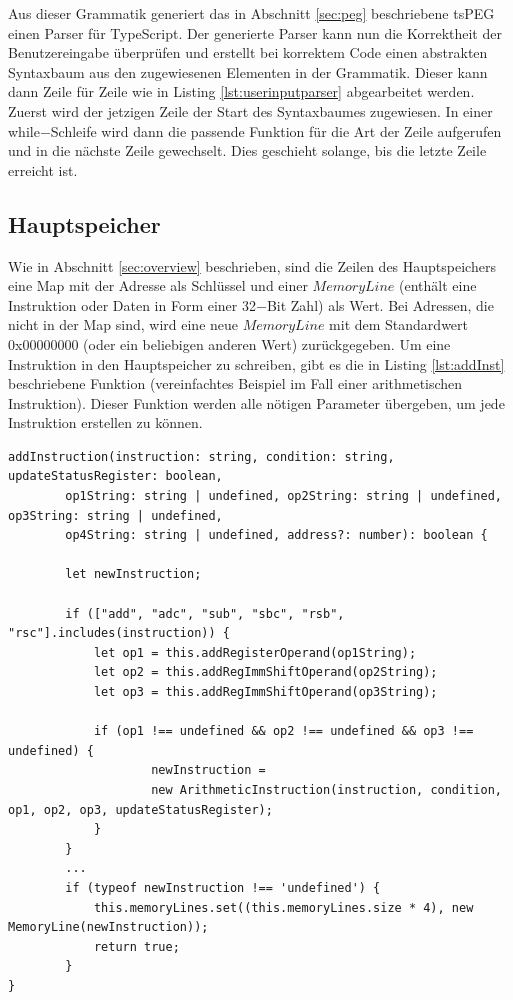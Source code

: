 \documentclass[a4paper, 11pt, onecolumn]{article}
\begin{document}
Aus dieser Grammatik generiert das in Abschnitt \ref{sec:peg} beschriebene tsPEG \cite{tspeg} einen Parser für TypeScript. Der generierte Parser kann nun die Korrektheit der Benutzereingabe überprüfen und erstellt bei korrektem Code einen abstrakten Syntaxbaum aus den zugewiesenen Elementen in der Grammatik. Dieser kann dann Zeile für Zeile wie in Listing \ref{lst:userinputparser} abgearbeitet werden. Zuerst wird der jetzigen Zeile der Start des Syntaxbaumes zugewiesen. In einer while$-$Schleife wird dann die passende Funktion für die Art der Zeile aufgerufen und in die nächste Zeile gewechselt. Dies geschieht solange, bis die letzte Zeile erreicht ist.\\

\subsection{Hauptspeicher}\label{sec:mainMemory}

Wie in Abschnitt \ref{sec:overview} beschrieben, sind die Zeilen des Hauptspeichers eine Map mit der Adresse als Schlüssel und einer $MemoryLine$ (enthält eine Instruktion oder Daten in Form einer 32$-$Bit Zahl) als Wert. Bei Adressen, die nicht in der Map sind, wird eine neue $MemoryLine$ mit dem Standardwert 0x00000000 (oder ein beliebigen anderen Wert) zurückgegeben. Um eine Instruktion in den Hauptspeicher zu schreiben, gibt es die in Listing \ref{lst:addInst} beschriebene Funktion (vereinfachtes Beispiel im Fall einer arithmetischen Instruktion). Dieser Funktion werden alle nötigen Parameter übergeben, um jede Instruktion erstellen zu können. \\


\begin{lstlisting}[style=JavaScript, basicstyle=\footnotesize, backgroundcolor=\color{backcolour}, caption={[Funktion $-$ Hinzufügen von Instruktionen]Hinzufügen einer Instruktion am Beispiel einer arithmetischen Instruktion}, captionpos=b, label={lst:addInst}]
addInstruction(instruction: string, condition: string, updateStatusRegister: boolean,
        op1String: string | undefined, op2String: string | undefined, op3String: string | undefined,
        op4String: string | undefined, address?: number): boolean {

        let newInstruction;

        if (["add", "adc", "sub", "sbc", "rsb", "rsc"].includes(instruction)) {
            let op1 = this.addRegisterOperand(op1String);
            let op2 = this.addRegImmShiftOperand(op2String);
            let op3 = this.addRegImmShiftOperand(op3String);

            if (op1 !== undefined && op2 !== undefined && op3 !== undefined) {
                    newInstruction =
                    new ArithmeticInstruction(instruction, condition, op1, op2, op3, updateStatusRegister);
            }
        }
        ...           
        if (typeof newInstruction !== 'undefined') {
            this.memoryLines.set((this.memoryLines.size * 4), new MemoryLine(newInstruction));
            return true;
        }   
}      	 
\end{lstlisting}
\end{document}
